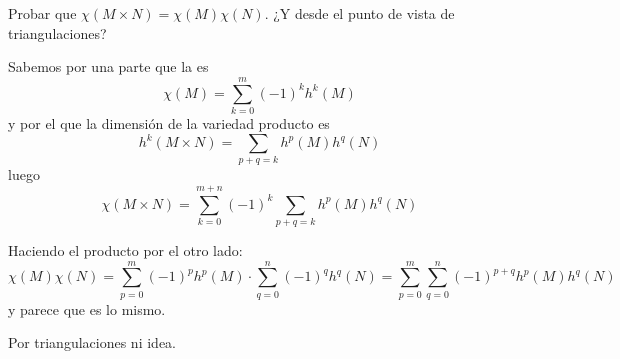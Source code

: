 \begin{problem}[4] Probar que $χ(M × N) = χ(M) χ(N)$. ¿Y desde el punto de vista de triangulaciones?

\solution


Sabemos por una parte que la  es \[ χ(M) = \sum_{k=0}^m (-1)^k h^k(M) \] y por el  que la dimensión de la variedad producto es \[ h^k(M × N) = \sum_{p + q = k} h^p(M) h^q(N) \] luego \[ χ(M ×N) = \sum_{k = 0}^{m + n} (-1)^k\sum_{ p + q = k} h^p(M) h^q(N) \]

Haciendo el producto por el otro lado: \[ χ(M) χ(N) = \sum_{p = 0}^m (-1)^p h^p(M) · \sum_{q = 0}^n (-1)^q h^q(N) = \sum_{p = 0}^m \sum_{q=0}^n (-1)^{p+q} h^p(M) h^q(N) \] y parece que es lo mismo.

Por triangulaciones ni idea.

\end{problem}

